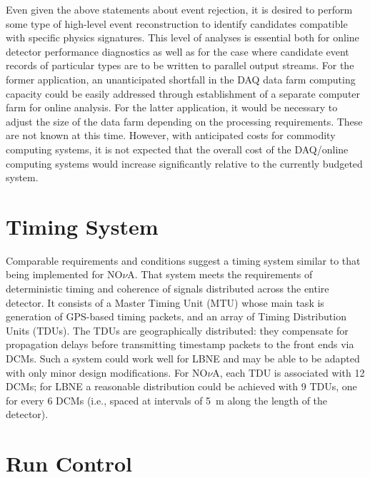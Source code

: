 Even given the above statements about event rejection, it is desired to 
perform some type of high-level event reconstruction to identify candidates 
compatible with specific physics signatures.  This level of analyses is 
essential both for online detector performance diagnostics as well as 
for the case where candidate event records of particular types are to be 
written to parallel output streams.  For the former application, 
an unanticipated shortfall in the DAQ data farm computing capacity 
could be easily addressed through establishment of a separate computer farm 
for online analysis.
For the latter application, it would be necessary to adjust the size of 
the data farm depending on the processing requirements.  These are not 
known at this time.  However, with anticipated costs for commodity 
computing systems, it is not expected that the overall cost of the 
DAQ/online computing systems would increase significantly relative to 
the currently budgeted system.%

\section{Timing System }
\label{sec:v5-trig-timing}

Comparable requirements and conditions suggest a timing system 
similar to that being implemented for NO$\nu$A.  That system meets the 
requirements of deterministic timing and coherence of signals distributed 
across the entire detector.   It consists of a Master Timing Unit (MTU)
whose main task is generation of GPS-based timing packets, and an 
array of Timing Distribution Units (TDUs).  The TDUs are geographically 
distributed: they compensate for propagation delays before transmitting 
timestamp packets to the front ends via DCMs.  Such a system could work 
well for LBNE and may be able to be adapted with only minor 
design modifications.  For NO$\nu$A, each TDU is associated with 12 DCMs; 
for LBNE a reasonable distribution could be achieved with 9 TDUs, 
one for every 6 DCMs (i.e., spaced at intervals of 5~m along the 
length of the detector).

\section{Run Control }
\label{sec:v5-trig-runcontrol}

